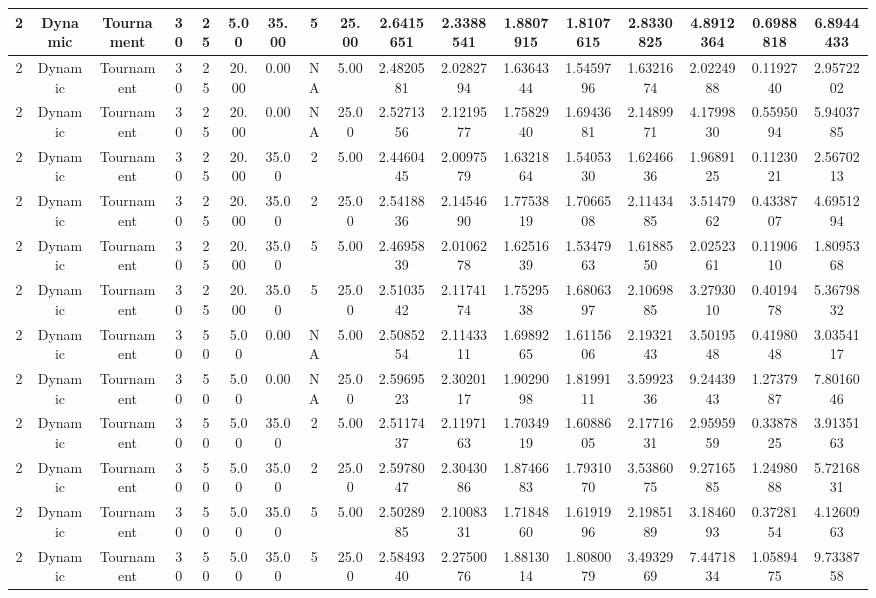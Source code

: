 \documentclass[a4paper]{article}
\begin{document}
\begin{center}
\begin{tabular}{ | c | c | c | c | c | c | c | c | c | c | c | c | c | c | c | c | c | }
		\hline
		2	&	Dynamic	&	Tournament	&	30	&	25	&	5.00	&	35.00	&	5	&	25.00	&	2.6415651	&	2.3388541	&	1.8807915	&	1.8107615	&	2.8330825	&	4.8912364	&	0.6988818	&	6.8944433 \\
		\hline
		2	&	Dynamic	&	Tournament	&	30	&	25	&	20.00	&	0.00	&	NA	&	5.00	&	2.4820581	&	2.0282794	&	1.6364344	&	1.5459796	&	1.6321674	&	2.0224988	&	0.1192740	&	2.9572202 \\
		\hline
		2	&	Dynamic	&	Tournament	&	30	&	25	&	20.00	&	0.00	&	NA	&	25.00	&	2.5271356	&	2.1219577	&	1.7582940	&	1.6943681	&	2.1489971	&	4.1799830	&	0.5595094	&	5.9403785 \\
		\hline
		2	&	Dynamic	&	Tournament	&	30	&	25	&	20.00	&	35.00	&	2	&	5.00	&	2.4460445	&	2.0097579	&	1.6321864	&	1.5405330	&	1.6246636	&	1.9689125	&	0.1123021	&	2.5670213 \\
		\hline
		2	&	Dynamic	&	Tournament	&	30	&	25	&	20.00	&	35.00	&	2	&	25.00	&	2.5418836	&	2.1454690	&	1.7753819	&	1.7066508	&	2.1143485	&	3.5147962	&	0.4338707	&	4.6951294 \\
		\hline
		2	&	Dynamic	&	Tournament	&	30	&	25	&	20.00	&	35.00	&	5	&	5.00	&	2.4695839	&	2.0106278	&	1.6251639	&	1.5347963	&	1.6188550	&	2.0252361	&	0.1190610	&	1.8095368 \\
		\hline
		2	&	Dynamic	&	Tournament	&	30	&	25	&	20.00	&	35.00	&	5	&	25.00	&	2.5103542	&	2.1174174	&	1.7529538	&	1.6806397	&	2.1069885	&	3.2793010	&	0.4019478	&	5.3679832 \\
		\hline
		2	&	Dynamic	&	Tournament	&	30	&	50	&	5.00	&	0.00	&	NA	&	5.00	&	2.5085254	&	2.1143311	&	1.6989265	&	1.6115606	&	2.1932143	&	3.5019548	&	0.4198048	&	3.0354117 \\
		\hline
		2	&	Dynamic	&	Tournament	&	30	&	50	&	5.00	&	0.00	&	NA	&	25.00	&	2.5969523	&	2.3020117	&	1.9029098	&	1.8199111	&	3.5992336	&	9.2443943	&	1.2737987	&	7.8016046 \\
		\hline
		2	&	Dynamic	&	Tournament	&	30	&	50	&	5.00	&	35.00	&	2	&	5.00	&	2.5117437	&	2.1197163	&	1.7034919	&	1.6088605	&	2.1771631	&	2.9595959	&	0.3387825	&	3.9135163 \\
		\hline
		2	&	Dynamic	&	Tournament	&	30	&	50	&	5.00	&	35.00	&	2	&	25.00	&	2.5978047	&	2.3043086	&	1.8746683	&	1.7931070	&	3.5386075	&	9.2716585	&	1.2498088	&	5.7216831 \\
		\hline
		2	&	Dynamic	&	Tournament	&	30	&	50	&	5.00	&	35.00	&	5	&	5.00	&	2.5028985	&	2.1008331	&	1.7184860	&	1.6191996	&	2.1985189	&	3.1846093	&	0.3728154	&	4.1260963 \\
		\hline
		2	&	Dynamic	&	Tournament	&	30	&	50	&	5.00	&	35.00	&	5	&	25.00	&	2.5849340	&	2.2750076	&	1.8813014	&	1.8080079	&	3.4932969	&	7.4471834	&	1.0589475	&	9.7338758 \\

\end{tabular}
\end{center}
\end{document}
